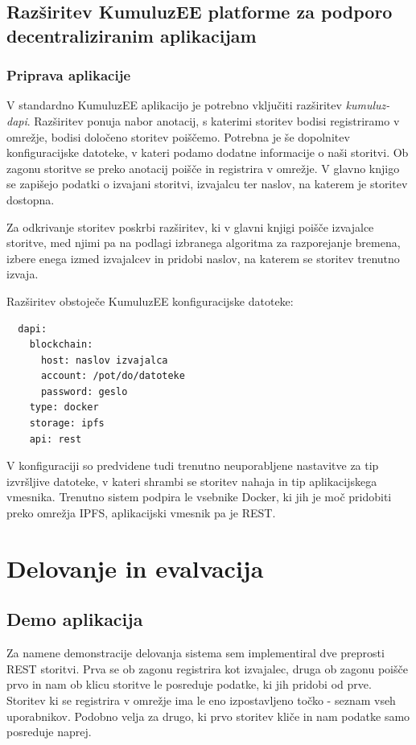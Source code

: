 \documentclass[a4paper, 12pt]{book}
\begin{document}
\section{Razširitev KumuluzEE platforme za podporo decentraliziranim aplikacijam}

\subsection{Priprava aplikacije}
V standardno KumuluzEE aplikacijo je potrebno vključiti razširitev \textit{kumuluz-dapi}. 
Razširitev ponuja nabor anotacij, s katerimi storitev bodisi registriramo v omrežje, bodisi določeno storitev poiščemo.
Potrebna je še dopolnitev konfiguracijske datoteke, v kateri podamo dodatne informacije o naši storitvi.
Ob zagonu storitve se preko anotacij poišče in registrira v omrežje.
V glavno knjigo se zapišejo podatki o izvajani storitvi, izvajalcu ter naslov, na katerem je storitev dostopna.

Za odkrivanje storitev poskrbi razširitev, ki v glavni knjigi poišče izvajalce storitve, med njimi pa na podlagi izbranega algoritma za razporejanje bremena, izbere enega izmed izvajalcev in pridobi naslov, na katerem se storitev trenutno izvaja.

Razširitev obstoječe KumuluzEE konfiguracijske datoteke:
\begin{lstlisting}
  dapi:
    blockchain:
      host: naslov izvajalca
      account: /pot/do/datoteke
      password: geslo
    type: docker
    storage: ipfs
    api: rest
\end{lstlisting}

V konfiguraciji so predvidene tudi trenutno neuporabljene nastavitve za tip izvršljive datoteke, v kateri shrambi se storitev nahaja in tip aplikacijskega vmesnika.
Trenutno sistem podpira le vsebnike Docker, ki jih je moč pridobiti preko omrežja IPFS, aplikacijski vmesnik pa je REST.


\chapter{Delovanje in evalvacija}

\section{Demo aplikacija}

Za namene demonstracije delovanja sistema sem implementiral dve preprosti REST storitvi.
Prva se ob zagonu registrira kot izvajalec, druga ob zagonu poišče prvo in nam ob klicu storitve le posreduje podatke, ki jih pridobi od prve.
Storitev ki se registrira v omrežje ima le eno izpostavljeno točko - seznam vseh uporabnikov.
Podobno velja za drugo, ki prvo storitev kliče in nam podatke samo posreduje naprej.
\end{document}

